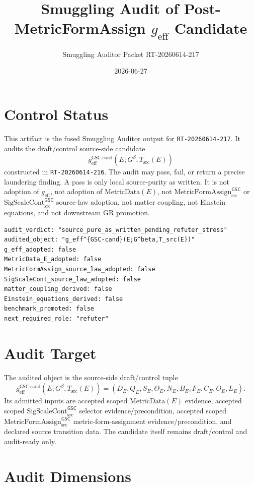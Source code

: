 \documentclass[11pt]{article}
\title{Smuggling Audit of Post-MetricFormAssign \texorpdfstring{$g_{\mathrm{eff}}$}{g_eff} Candidate}
\author{Smuggling Auditor Packet RT-20260614-217}
\date{2026-06-27}
\newcommand{\Gbeta}{G^\beta}
\newcommand{\SigScaleCont}{\mathrm{SigScaleCont}^{\mathsf{GSC}}_{\mathrm{src}}}
\newcommand{\MetricFormAssign}{\mathrm{MetricFormAssign}^{\mathsf{GSC}}_{\mathrm{src}}}
\newcommand{\geff}{g_{\mathrm{eff}}}
\newcommand{\geffCand}{g_{\mathrm{eff}}^{\mathsf{GSC}\mbox{-}\mathrm{cand}}}
\begin{document}
\maketitle

\section{Control Status}

This artifact is the fused Smuggling Auditor output for
\texttt{RT-20260614-217}. It audits the draft/control source-side candidate
\[
  \geffCand(E;\Gbeta,T_{\mathrm{src}}(E))
\]
constructed in \texttt{RT-20260614-216}. The audit may pass, fail, or return a
precise laundering finding. A pass is only local source-purity as written. It
is not adoption of \(\geff\), not adoption of \(\mathrm{MetricData}(E)\), not
\(\MetricFormAssign\) or \(\SigScaleCont\) source-law adoption, not matter
coupling, not Einstein equations, and not downstream GR promotion.

\begin{verbatim}
audit_verdict: "source_pure_as_written_pending_refuter_stress"
audited_object: "g_eff^{GSC-cand}(E;G^beta,T_src(E))"
g_eff_adopted: false
MetricData_E_adopted: false
MetricFormAssign_source_law_adopted: false
SigScaleCont_source_law_adopted: false
matter_coupling_derived: false
Einstein_equations_derived: false
benchmark_promoted: false
next_required_role: "refuter"
\end{verbatim}

\section{Audit Target}

The audited object is the source-side draft/control tuple
\[
  \geffCand(E;\Gbeta,T_{\mathrm{src}}(E))
  =(D_E,Q_E,S_E,\Theta_E,N_E,B_E,F_E,C_E,O_E,L_E).
\]
Its admitted inputs are accepted scoped \(\mathrm{MetricData}(E)\) evidence,
accepted scoped \(\SigScaleCont\) selector evidence/precondition, accepted
scoped \(\MetricFormAssign\) metric-form-assignment evidence/precondition, and
declared source transition data. The candidate itself remains draft/control
and audit-ready only.

\section{Audit Dimensions}
\end{document}
